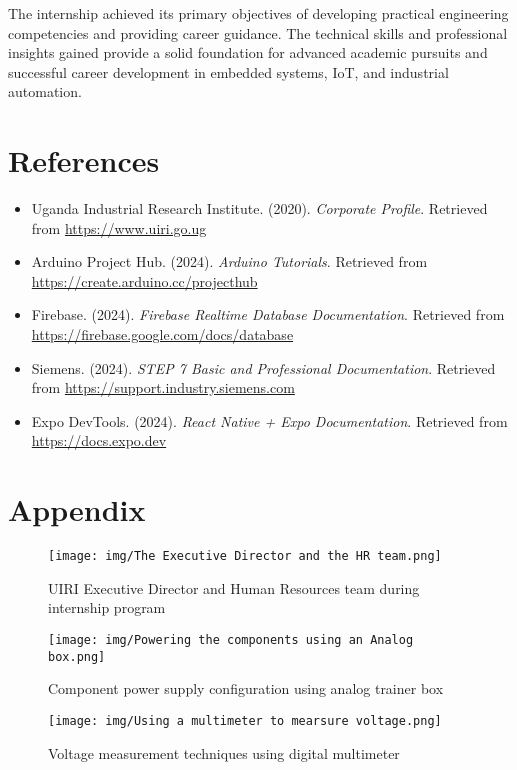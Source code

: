 \documentclass[12pt,a4paper]{report}
\begin{document}
The internship achieved its primary objectives of developing practical engineering competencies and providing career guidance. The technical skills and professional insights gained provide a solid foundation for advanced academic pursuits and successful career development in embedded systems, IoT, and industrial automation.

\chapter*{References}

\begin{itemize}
    \item Uganda Industrial Research Institute. (2020). \textit{Corporate Profile}. Retrieved from \url{https://www.uiri.go.ug}
    \item Arduino Project Hub. (2024). \textit{Arduino Tutorials}. Retrieved from \url{https://create.arduino.cc/projecthub}
    \item Firebase. (2024). \textit{Firebase Realtime Database Documentation}. Retrieved from \url{https://firebase.google.com/docs/database}
    \item Siemens. (2024). \textit{STEP 7 Basic and Professional Documentation}. Retrieved from \url{https://support.industry.siemens.com}
    \item Expo DevTools. (2024). \textit{React Native + Expo Documentation}. Retrieved from \url{https://docs.expo.dev}
\end{itemize}

\appendix

\chapter*{Appendix}

\begin{figure}[H]
\centering
\texttt{[image: img/The Executive Director and the HR team.png]}
\caption{UIRI Executive Director and Human Resources team during internship program}
\label{fig:uiri-leadership}
\end{figure}

\begin{figure}[H]
\centering
\texttt{[image: img/Powering the components using an Analog box.png]}
\caption{Component power supply configuration using analog trainer box}
\label{fig:analog-power}
\end{figure}

\begin{figure}[H]
\centering
\texttt{[image: img/Using a multimeter to mearsure voltage.png]}
\caption{Voltage measurement techniques using digital multimeter}
\label{fig:multimeter-usage}
\end{figure}
\end{document}
